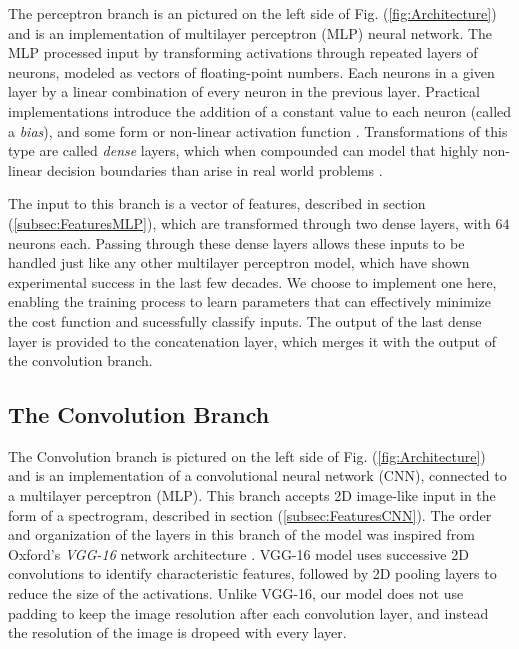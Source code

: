 \documentclass[conference,onecolumn,letterpaper]{IEEEtran}
\begin{document}
The perceptron branch is an pictured on the left side of Fig. (\ref{fig:Architecture}) and is an implementation of multilayer perceptron (MLP) neural network. The MLP processed input by transforming activations through repeated layers of neurons, modeled as vectors of floating-point numbers. Each neurons in a given layer by a linear combination of every neuron in the previous layer. Practical implementations introduce the addition of a constant value to each neuron (called a \textit{bias}), and some form or non-linear activation function \cite{Geron,Goodfellow}. Transformations of this type are called \textit{dense} layers, which when compounded can model that highly non-linear decision boundaries than arise in real world problems \cite{James}.

The input to this branch is a vector of features, described in section (\ref{subsec:FeaturesMLP}), which are transformed through two dense layers, with $64$ neurons each. Passing through these dense layers allows these inputs to be handled just like any other multilayer perceptron model, which have shown experimental success in the last few decades. We choose to implement one here, enabling the training process to learn parameters that can effectively minimize the cost function and sucessfully classify inputs. The output of the last dense layer is provided to the concatenation layer, which merges it with the output of the convolution branch. 




\subsection{The Convolution Branch}
\label{subsec:CNN}

The Convolution branch is pictured on the left side of Fig. (\ref{fig:Architecture}) and is an implementation of a convolutional neural network (CNN), connected to a multilayer perceptron (MLP). This branch accepts 2D image-like input in the form of a spectrogram, described in section (\ref{subsec:FeaturesCNN}). The order and organization of the layers in this branch of the model was inspired from Oxford's \textit{VGG-16} network architecture \cite{Geron}. VGG-16 model uses successive 2D convolutions to identify characteristic features, followed by 2D pooling layers to reduce the size of the activations. Unlike VGG-16, our model does not use padding to keep the image resolution after each convolution layer, and instead the resolution of the image is dropeed with every layer.
\end{document}
